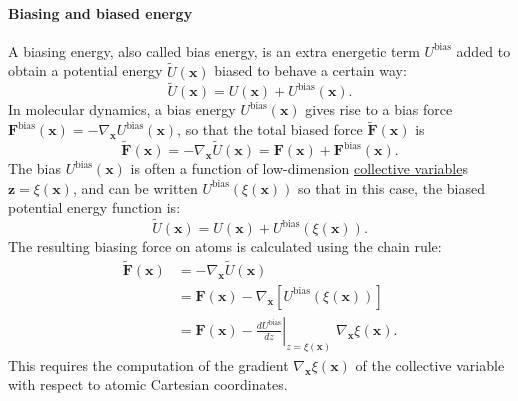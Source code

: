 \documentclass[9pt,review]{livecoms}
\newcommand{\vx}{\mathbf{x}}
\newcommand{\vz}{\mathbf{z}}
\newcommand{\vF}{\mathbf{F}}
\begin{document}
\hypertarget{ref:biasingE} {\paragraph{Biasing and biased energy}}
A biasing energy, also called bias energy, is an extra energetic term $U^\mathrm{bias}$ added to obtain a potential energy $\tilde{U}(\vx)$ biased to behave a certain way:
\begin{equation}
\tilde{U}(\vx) =  U(\vx) + U^\mathrm{bias}(\vx).
\end{equation}
In molecular dynamics, a bias energy
$U^\mathrm{bias}(\vx)$ gives rise to a bias force $\vF^\mathrm{bias}(\vx) = -\nabla_{\vx} U^\mathrm{bias}(\vx)$, so that the total biased force $\tilde{\vF}(\vx)$ is
\begin{equation}
\tilde{\vF}(\vx) = -\nabla_{\vx} \tilde U(\vx) = \vF(\vx) + \vF^\mathrm{bias}(\vx).
\end{equation}
The bias $U^\mathrm{bias}(\vx)$ is often a function of low-dimension \hyperlink{ref:CV} {collective variable}s $\vz = \xi(\vx)$, and can be written $U^\mathrm{bias}(\xi(\vx))$ so that in this case, the biased potential energy function is:
\begin{equation}
\tilde{U}(\vx) =  U(\vx) + U^\mathrm{bias}(\xi(\vx)).
\end{equation}
The resulting biasing force on atoms is calculated using the chain rule:
\begin{align}
\tilde{\vF}(\vx) &= -\nabla_{\vx} \tilde U(\vx) \nonumber \\
&= \vF(\vx) -\nabla_{\vx} [ U^\mathrm{bias}(\xi(\vx))] \nonumber \\
&= \vF(\vx) - \left . \frac{dU^\mathrm{bias}}{dz}\right |_{z=\xi(\vx)} \; \nabla_{\vx}\xi(\vx).
\end{align}
This requires the computation of the gradient $\nabla_{\vx}\xi(\vx)$ of the collective variable with respect to atomic Cartesian coordinates.
\end{document}
